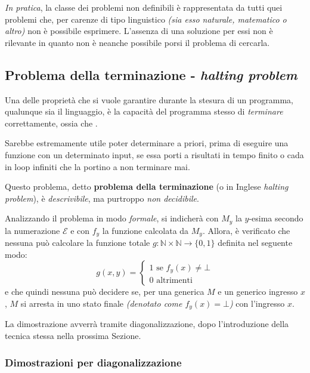 \documentclass[italian, 10pt]{article}
\begin{document}
\textit{In pratica}, la classe dei problemi non definibili è rappresentata da tutti quei problemi che, per carenze di tipo linguistico \textit{(sia esso naturale, matematico o altro)} non è possibile esprimere.
L'assenza di una soluzione per essi non è rilevante in quanto non è neanche possibile porsi il problema di cercarla.

\subsection{Problema della terminazione - \textit{halting problem}}
\label{sec:problema-della-terminazione}

Una delle proprietà che si vuole garantire durante la stesura di un programma, qualunque sia il linguaggio, è la capacità del programma stesso di \textit{terminare} correttamente, ossia che .

Sarebbe estremamente utile poter determinare a priori, prima di eseguire una funzione con un determinato input, se essa porti a risultati in tempo finito o cada in loop infiniti che la portino a non terminare mai.

Questo problema, detto \textbf{problema della terminazione} (o in Inglese \textit{halting problem}), è \textit{descrivibile}, ma purtroppo \textit{non decidibile}.

\bigskip
Analizzando il problema in modo \textit{formale}, si indicherà con \(M_y\) la \TM \(y\)-esima secondo la numerazione \(\mathscr{E}\) e con \(f_y\) la funzione calcolata da \(M_y\).
Allora, è verificato che nessuna \TM può calcolare la funzione totale \(g: \mathbb{N} \times \mathbb{N} \rightarrow \{0, 1\}\) definita nel seguente modo:
\[ g(x, y) =
  \begin{cases}
    1 \text{ se } f_y(x) \neq \bot \\
    0 \text{ altrimenti}
  \end{cases}
\]
e che quindi nessuna \TM può decidere se, per una generica \TM \(M\) e un generico ingresso \(x\), \(M\) si arresta in uno stato finale \textit{(denotato come \(f_y(x) = \bot\))} con l'ingresso \(x\).

La dimostrazione avverrà tramite diagonalizzazione, dopo l'introduzione della tecnica stessa nella prossima Sezione.

\subsubsection{Dimostrazioni per diagonalizzazione}
\end{document}
